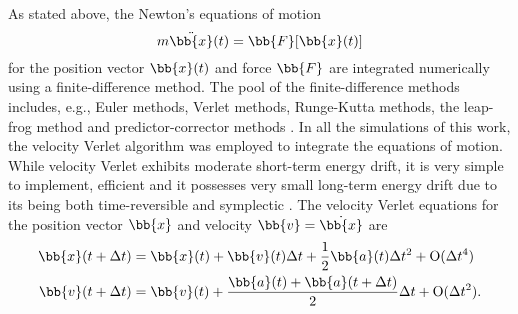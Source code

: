 As stated above, the Newton's equations of motion 
\begin{equation}
 m \ddot{\bb{x}}(t) = \bb{F}[\bb{x}(t)]
\end{equation}
for the position vector $\bb{x}(t)$ and force $\bb{F}$ are integrated numerically using a finite-difference method. The pool of the finite-difference methods includes, e.g., Euler methods, Verlet methods, Runge-Kutta methods, the leap-frog method and predictor-corrector methods \cite{}. In all the simulations of this work, the velocity Verlet algorithm was employed to integrate the equations of motion. While velocity Verlet exhibits moderate short-term energy drift, it is very simple to implement, efficient and it possesses very small long-term energy drift due to its being both time-reversible and symplectic \cite{}. The velocity Verlet equations for the position vector $\bb{x}$ and velocity $\bb{v}=\dot{\bb{x}}$ are
\begin{alignat}{2}
  \bb{x}(t+\Delta t) &= \bb{x}(t) + \bb{v}(t)\Delta t+  \frac{1}{2}\bb{a}(t) \Delta t^2 + \mathrm{O}(\Delta t^4) \\
  \bb{v}(t+\Delta t) &= \bb{v}(t) + \frac{ \bb{a}(t)+\bb{a}(t+\Delta t)}{2} \Delta t+ \mathrm{O}(\Delta t^2) .
\end{alignat}






